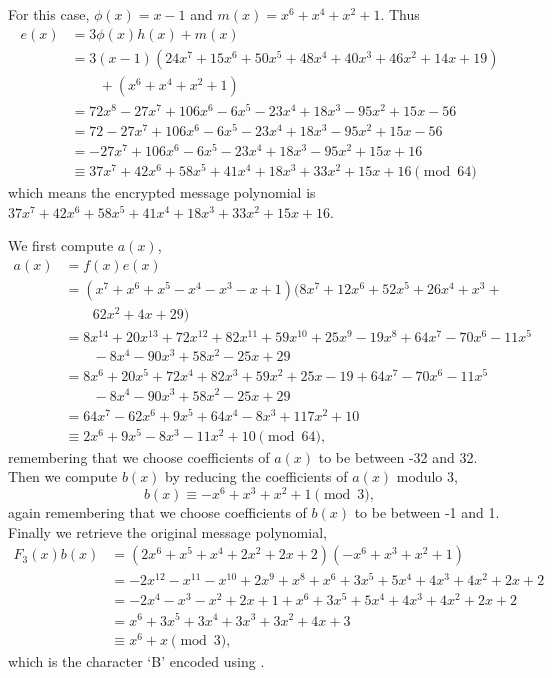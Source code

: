 \begin{questions}
    \item For this case, $\phi(x) = x - 1$ and $m(x) = x^6 + x^4 + x^2 + 1$. Thus
    \begin{align*}
        e(x) &= 3\phi(x)h(x) + m(x) \\
        &= 3(x-1)(24x^7 + 15x^6 + 50x^5 + 48x^4 + 40x^3 + 46x^2 + 14x + 19)\\
        &\quad\quad + (x^6 + x^4 + x^2 + 1)\\
        &= 72x^8 - 27x^7 + 106x^6 - 6x^5 - 23x^4 + 18x^3 - 95x^2 + 15x - 56\\
        &= 72 - 27x^7 + 106x^6 - 6x^5 - 23x^4 + 18x^3 - 95x^2 + 15x - 56\\
        &= -27x^7 + 106x^6 - 6x^5 - 23x^4 + 18x^3 - 95x^2 + 15x + 16\\
        &\equiv 37x^7 + 42x^6 + 58x^5 + 41x^4 + 18x^3 + 33x^2 + 15x + 16 \pmod{64}
    \end{align*}
    which means the encrypted message polynomial is $37x^7 + 42x^6 + 58x^5 + 41x^4 + 18x^3 + 33x^2 + 15x + 16$.

    \item We first compute $a(x)$,
    \begin{align*}
        a(x) &= f(x)e(x)\\
        &= (x^7 +x^6 +x^5 -x^4 -x^3 -x + 1)(8x^7 + 12x^6 + 52x^5 + 26x^4 +x^3 +\\
        &\quad\quad62x^2 + 4x + 29)\\
        &= 8x^{14} + 20x^{13} + 72x^{12} + 82x^{11} + 59x^{10} + 25x^9 - 19x^8 + 64x^7 - 70x^6 - 11x^5\\
        &\quad\quad - 8x^4 - 90x^3 + 58x^2 - 25x + 29\\
        &= 8x^6 + 20x^5 + 72x^4 + 82x^3 + 59x^2 + 25x - 19 + 64x^7 - 70x^6 - 11x^5\\
        &\quad\quad - 8x^4 - 90x^3 + 58x^2 - 25x + 29\\
        &= 64x^7 - 62x^6 + 9x^5 + 64x^4 - 8x^3 + 117x^2 + 10\\
        &\equiv 2x^6 + 9x^5 - 8x^3 - 11x^2 + 10 \pmod{64},
    \end{align*}
    remembering that we choose coefficients of $a(x)$ to be between -32 and 32. Then we compute $b(x)$ by reducing the coefficients of $a(x)$ modulo 3,
    \[
        b(x) \equiv -x^6 + x^3 + x^2 + 1 \pmod{3},
    \]
    again remembering that we choose coefficients of $b(x)$ to be between -1 and 1. Finally we retrieve the original message polynomial,
    \begin{align*}
        F_3(x)b(x) &= (2x^6 +x^5 +x^4 + 2x^2 + 2x + 2)(-x^6 + x^3 + x^2 + 1)\\
        &= -2x^{12} - x^{11} - x^{10} + 2x^9 + x^8 + x^6 + 3x^5 + 5x^4 + 4x^3 + 4x^2 + 2x + 2\\
        &= -2x^4 - x^3 - x^2 + 2x + 1 + x^6 + 3x^5 + 5x^4 + 4x^3 + 4x^2 + 2x + 2\\
        &= x^6 + 3x^5 + 3x^4 + 3x^3 + 3x^2 + 4x + 3\\
        &\equiv x^6 + x \pmod{3},
    \end{align*}
    which is the character `B' encoded using .
\end{questions}
